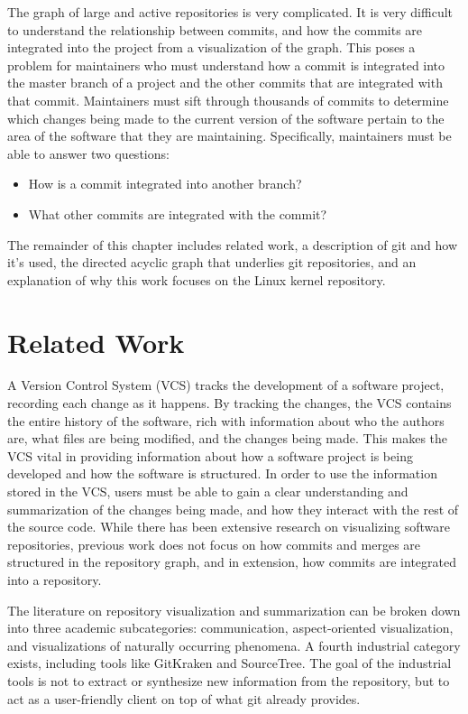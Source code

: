 The graph of large and active repositories is very complicated.
It is very difficult to understand the relationship between commits, and
how the commits are integrated into the project from a visualization of
the graph.
This poses a problem for maintainers who must understand how a
commit is integrated into the master branch of a
project and the other commits that are integrated with that commit.
Maintainers must sift through thousands of commits to determine which
changes being made to the current version of the software pertain to
the area of the software that they are maintaining.
Specifically, maintainers must be able to answer two questions:

\begin{textbox}
\begin{itemize}
  \item How is a commit integrated into another branch?
  \item What other commits are integrated with the commit?
\end{itemize}
\end{textbox}

The remainder of this chapter includes related work, a description of
git and how it's used, the directed acyclic graph that underlies git
repositories, and an explanation of why this work focuses on the Linux
kernel repository.

\section{Related Work}\label{sec:related_work}

A Version Control System (VCS) tracks the development of a software project,
recording each change as it happens. By tracking the changes, the VCS
contains the entire history of the software, rich with information about
who the authors are, what files are being modified, and the changes
being made.
This makes the VCS vital in providing information about
how a software project is being developed and how the software is
structured. In order to use the information stored in the VCS, users
must be able to gain a clear understanding and summarization of the
changes being made, and how they interact with the rest of the source
code. While there has been extensive research on visualizing software
repositories, previous work does not focus on how commits and merges are
structured in the repository graph, and in extension, how commits are
integrated into a repository.

The literature on repository visualization
and summarization can be broken down into three academic subcategories:
communication\cite{Cubranic2005,Begel2010}, aspect-oriented
visualization\cite{Ambros2005,Burch2005,Ambros2009}, and visualizations of naturally occurring phenomena\cite{ogawa09,Caudwell2010}.
A fourth industrial category exists, including tools like GitKraken and
SourceTree.
The goal of the industrial tools is not to extract or synthesize new
information from the repository, but to act as a user-friendly client
on top of what git already provides.

